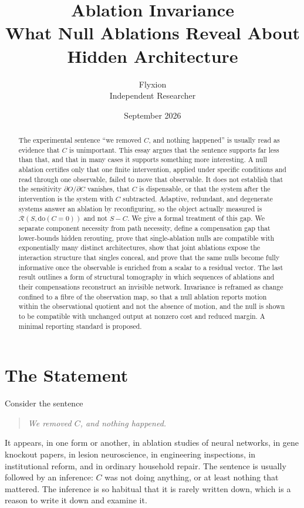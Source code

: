 \documentclass[11pt]{article}
\title{\textbf{Ablation Invariance}\\[0.4em]
\large What Null Ablations Reveal About Hidden Architecture}
\author{Flyxion\\Independent Researcher}
\date{September 2026}
\theoremstyle{definition}
\theoremstyle{remark}
\newcommand{\Rop}{\mathcal{R}}
\newcommand{\dox}[1]{\mathrm{do}(#1)}
\begin{document}
\maketitle

\begin{abstract}
\noindent
The experimental sentence ``we removed $C$, and nothing happened'' is usually read as evidence that $C$ is unimportant. This essay argues that the sentence supports far less than that, and that in many cases it supports something more interesting. A null ablation certifies only that one finite intervention, applied under specific conditions and read through one observable, failed to move that observable. It does not establish that the sensitivity $\partial O/\partial C$ vanishes, that $C$ is dispensable, or that the system after the intervention is the system with $C$ subtracted. Adaptive, redundant, and degenerate systems answer an ablation by reconfiguring, so the object actually measured is $\Rop(S,\dox{C=0})$ and not $S-C$. We give a formal treatment of this gap. We separate component necessity from path necessity, define a compensation gap that lower-bounds hidden rerouting, prove that single-ablation nulls are compatible with exponentially many distinct architectures, show that joint ablations expose the interaction structure that singles conceal, and prove that the same nulls become fully informative once the observable is enriched from a scalar to a residual vector. The last result outlines a form of structural tomography in which sequences of ablations and their compensations reconstruct an invisible network. Invariance is reframed as change confined to a fibre of the observation map, so that a null ablation reports motion within the observational quotient and not the absence of motion, and the null is shown to be compatible with unchanged output at nonzero cost and reduced margin. A minimal reporting standard is proposed.
\end{abstract}

\tableofcontents
\newpage

\section{The Statement}

Consider the sentence
\begin{quote}
\emph{We removed $C$, and nothing happened.}
\end{quote}
It appears, in one form or another, in ablation studies of neural networks, in gene knockout papers, in lesion neuroscience, in engineering inspections, in institutional reform, and in ordinary household repair. The sentence is usually followed by an inference: $C$ was not doing anything, or at least nothing that mattered. The inference is so habitual that it is rarely written down, which is a reason to write it down and examine it.
\end{document}
